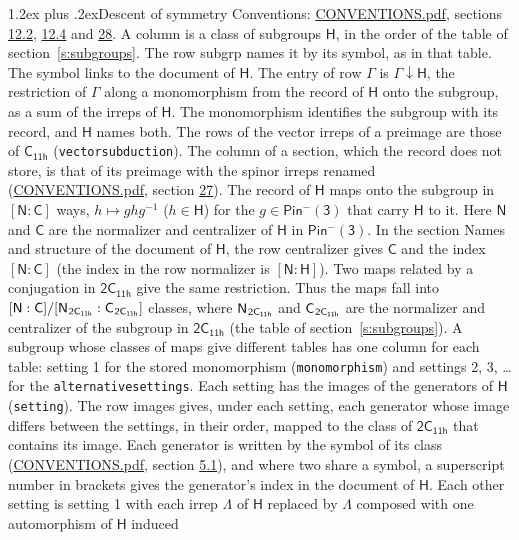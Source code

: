 \documentclass[10pt,a4paper]{article}
\makeatletter
\renewcommand\section{\@startsection{section}{1}{\z@}{-3ex plus -1ex minus -.2ex}%
  {1.2ex plus .2ex}{\normalfont\large\sffamily\bfseries\color{parttitle}}}
\numberwithin{equation}{section}
\newcommand{\grp}[1]{\mathsf{#1}}
\newcommand{\grpindex}[2]{[#1 : #2]}
\newcommand{\restr}[2]{#1\!\downarrow#2}
\newcommand{\hairsp}{\mkern1mu}
\makeatother
\begin{document}
\section{Descent of symmetry}\label{s:subduction}
Conventions: \href{../../CONVENTIONS.pdf}{CONVENTIONS.pdf}, sections \href{../../../rotation/CONVENTIONS.pdf\#conv.12.2}{12.2}, \href{../../../rotation/CONVENTIONS.pdf\#conv.12.4}{12.4} and \href{../../CONVENTIONS.pdf\#conv.28}{28}.
A column is a class of subgroups $\grp{H}$, in the order of the table of section~\ref{s:subgroups}. The row subgrp names it by its symbol, as in that table. The symbol links to the document of $\grp{H}$. The entry of row $\Gamma$ is $\restr{\Gamma}{\grp{H}}$, the restriction of $\Gamma$ along a monomorphism from the record of $\grp{H}$ onto the subgroup, as a sum of the irreps of $\grp{H}$. The monomorphism identifies the subgroup with its record, and $\grp{H}$ names both. The rows of the vector irreps of a preimage are those of \href{../../../rotation/data/pdf/C11h.pdf}{$\grp{C_{11h}}$} (\texttt{vectorsubduction}). The column of a section, which the record does not store, is that of its preimage with the spinor irreps renamed (\href{../../CONVENTIONS.pdf}{CONVENTIONS.pdf}, section \href{../../CONVENTIONS.pdf\#conv.27}{27}). \label{n:group.normalizer.o3}\label{n:group.centralizer.o3}\label{n:element.h}The record of $\grp{H}$ maps onto the subgroup in $\grpindex{\grp{N}}{\grp{C}}$ ways, $h \mapsto g h g^{-1}$ ($h \in \grp{H}$) for the $g \in \grp{Pin^{-}(3)}$ that carry $\grp{H}$ to it. Here $\grp{N}$ and $\grp{C}$ are the normalizer and centralizer of $\grp{H}$ in \href{Pinminus3.pdf}{$\grp{Pin^{-}(3)}$}. In the section Names and structure of the document of $\grp{H}$, the row centralizer gives $\grp{C}$ and the index $\grpindex{\grp{N}}{\grp{C}}$ (the index in the row normalizer is $\grpindex{\grp{N}}{\grp{H}}$). Two maps related by a conjugation in $\grp{2C_{11h}}$ give the same restriction. Thus the maps fall into $\grpindex{\grp{N}}{\grp{C}}/\grpindex{\grp{N}_{\hairsp \grp{2C_{11h}}}}{\grp{C}_{\hairsp \grp{2C_{11h}}}}$ classes, where $\grp{N}_{\hairsp \grp{2C_{11h}}}$ and $\grp{C}_{\hairsp \grp{2C_{11h}}}$ are the normalizer and centralizer of the subgroup in $\grp{2C_{11h}}$ (the table of section~\ref{s:subgroups}). \label{n:head.setting}A subgroup whose classes of maps give different tables has one column for each table: setting 1 for the stored monomorphism (\texttt{monomorphism}) and settings 2, 3, \dots{} for the \texttt{alternativesettings}. Each setting has the images of the generators of $\grp{H}$ (\texttt{setting}). \label{n:head.images}The row images gives, under each setting, each generator whose image differs between the settings, in their order, mapped to the class of $\grp{2C_{11h}}$ that contains its image. Each generator is written by the symbol of its class (\href{../../CONVENTIONS.pdf}{CONVENTIONS.pdf}, section \href{../../../rotation/CONVENTIONS.pdf\#conv.5.1}{5.1}), and where two share a symbol, a superscript number in brackets gives the generator's index in the document of $\grp{H}$. \label{n:irrep.Delta}Each other setting is setting 1 with each irrep $\Lambda$ of $\grp{H}$ replaced by $\Lambda$ composed with one automorphism of $\grp{H}$ induced 
\end{document}
